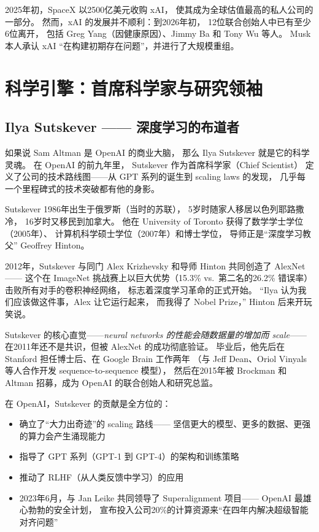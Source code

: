 2025年初，SpaceX 以2500亿美元收购 xAI，
使其成为全球估值最高的私人公司的一部分。
然而，xAI 的发展并不顺利：到2026年初，
12位联合创始人中已有至少6位离开，
包括 Greg Yang（因健康原因）、Jimmy Ba 和 Tony Wu 等人。
Musk 本人承认 xAI ``在构建初期存在问题''，并进行了大规模重组。


\section{科学引擎：首席科学家与研究领袖}
\label{sec:openai-research}

\subsection{Ilya Sutskever —— 深度学习的布道者}
\label{subsec:ilya-sutskever}

如果说 Sam Altman 是 OpenAI 的商业大脑，
那么 Ilya Sutskever 就是它的科学灵魂。
在 OpenAI 的前九年里，
Sutskever 作为首席科学家（Chief Scientist）
定义了公司的技术路线图——从 GPT 系列的诞生到 scaling laws 的发现，
几乎每一个里程碑式的技术突破都有他的身影。

Sutskever 1986年出生于俄罗斯（当时的苏联），
5岁时随家人移居以色列耶路撒冷，
16岁时又移民到加拿大。
他在 University of Toronto 获得了数学学士学位（2005年）、
计算机科学硕士学位（2007年）和博士学位，
导师正是``深度学习教父'' Geoffrey Hinton。

2012年，Sutskever 与同门 Alex Krizhevsky 和导师 Hinton 共同创造了 AlexNet——
这个在 ImageNet 挑战赛上以巨大优势（15.3\% vs.\ 第二名的26.2\% 错误率）
击败所有对手的卷积神经网络，
标志着深度学习革命的正式开始。
``Ilya 认为我们应该做这件事，Alex 让它运行起来，
而我得了 Nobel Prize，'' Hinton 后来开玩笑说。

Sutskever 的核心直觉——\emph{neural networks 的性能会随数据量的增加而 scale}——
在2011年还不是共识，但被 AlexNet 的成功彻底验证。
毕业后，他先后在 Stanford 担任博士后、在 Google Brain 工作两年
（与 Jeff Dean、Oriol Vinyals 等人合作开发 sequence-to-sequence 模型），
然后在2015年被 Brockman 和 Altman 招募，成为 OpenAI 的联合创始人和研究总监。

在 OpenAI，Sutskever 的贡献是全方位的：
\begin{itemize}[noitemsep]
  \item 确立了``大力出奇迹''的 scaling 路线——
        坚信更大的模型、更多的数据、更强的算力会产生涌现能力
  \item 指导了 GPT 系列（GPT-1 到 GPT-4）的架构和训练策略
  \item 推动了 RLHF（从人类反馈中学习）的应用
  \item 2023年6月，与 Jan Leike 共同领导了 Superalignment 项目——
        OpenAI 最雄心勃勃的安全计划，
        宣布投入公司20\%的计算资源来``在四年内解决超级智能对齐问题''
\end{itemize}

